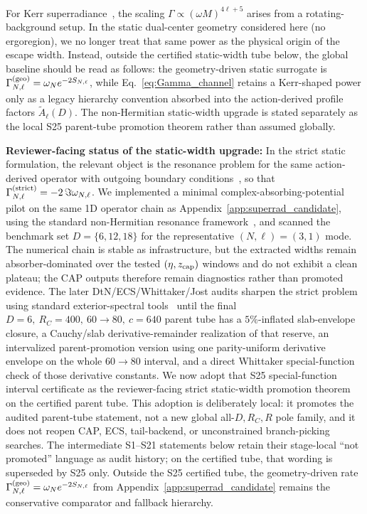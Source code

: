 \documentclass[aps,prd,onecolumn,notitlepage,nofootinbib,superscriptaddress,11pt,floatfix]{revtex4-2}
\begin{document}
For Kerr superradiance~\cite{DetweilerSuperrad1980}, the scaling $\Gamma \propto (\omega M)^{4\ell+5}$ arises from a rotating-background setup. In the static dual-center geometry considered here (no ergoregion), we no longer treat that same power as the physical origin of the escape width. Instead, outside the certified static-width tube below, the global baseline should be read as follows: the geometry-driven static surrogate is $\Gamma_{N,\ell}^{\rm(geo)}=\omega_N e^{-2S_{N,\ell}}$, while Eq.~\eqref{eq:Gamma_channel} retains a Kerr-shaped power only as a legacy hierarchy convention absorbed into the action-derived profile factors $\tilde A_\ell(D)$. The non-Hermitian static-width upgrade is stated separately as the local S25 parent-tube promotion theorem rather than assumed globally.

\textbf{Reviewer-facing status of the static-width upgrade:} In the strict static formulation, the relevant object is the resonance problem for the same action-derived operator with outgoing boundary conditions~\cite{Siegert1939,Teschl2014}, so that $\Gamma_{N,\ell}^{\rm(strict)}=-2\,\Im \omega_{N,\ell}$. We implemented a minimal complex-absorbing-potential pilot on the same 1D operator chain as Appendix~\ref{app:superrad_candidate}, using the standard non-Hermitian resonance framework~\cite{Moiseyev2011}, and scanned the benchmark set $D=\{6,12,18\}$ for the representative $(N,\ell)=(3,1)$ mode. The numerical chain is stable as infrastructure, but the extracted widths remain absorber-dominated over the tested $(\eta,z_{\rm cap})$ windows and do not exhibit a clean plateau; the CAP outputs therefore remain diagnostics rather than promoted evidence. The later DtN/ECS/Whittaker/Jost audits sharpen the strict problem using standard exterior-spectral tools~\cite{AguilarCombes1971,BalslevCombes1971,Olver2010} until the final \(D=6,\ R_C=400,\ 60\to80,\ c=640\) parent tube has a \(5\%\)-inflated slab-envelope closure, a Cauchy/slab derivative-remainder realization of that reserve, an intervalized parent-promotion version using one parity-uniform derivative envelope on the whole \(60\to80\) interval, and a direct Whittaker special-function check of those derivative constants.  We now adopt that S25 special-function interval certificate as the reviewer-facing strict static-width promotion theorem on the certified parent tube.  This adoption is deliberately local: it promotes the audited parent-tube statement, not a new global all-\(D,R_C,R\) pole family, and it does not reopen CAP, ECS, tail-backend, or unconstrained branch-picking searches.  The intermediate S1--S21 statements below retain their stage-local ``not promoted'' language as audit history; on the certified tube, that wording is superseded by S25 only.  Outside the S25 certified tube, the geometry-driven rate \(\Gamma_{N,\ell}^{\rm(geo)}=\omega_N e^{-2S_{N,\ell}}\) from Appendix~\ref{app:superrad_candidate} remains the conservative comparator and fallback hierarchy.
\end{document}
